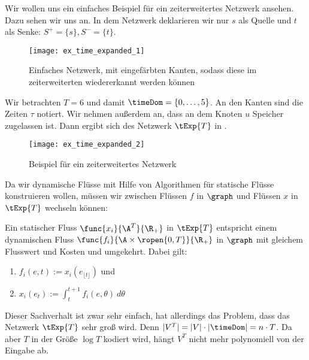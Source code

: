 \begin{example}
    Wir wollen uns ein einfaches Beispiel für ein zeiterweitertes Netzwerk 
    ansehen. Dazu sehen wir uns  an. In dem
    Netzwerk deklarieren wir nur $s$ als Quelle und $t$ als Senke:
    $S^+ = \{s\}, S^- = \{t\}$.

    \begin{figure}[H]
    \centering
    \texttt{[image: ex\_time\_expanded\_1]}
    \caption{Einfaches Netzwerk, mit eingefärbten Kanten, sodass diese im
                zeiterweiterten wiedererkannt werden können}
    \label{fig:ex_time_expanded_1}
    \end{figure}

    Wir betrachten $T = 6$ und damit $\timeDom = \{0, \ldots, 5\}$. An den
    Kanten sind die Zeiten $\tau$ notiert. Wir nehmen außerdem an, dass
    an dem Knoten $u$ Speicher zugelassen ist. Dann ergibt sich
    des Netzwerk $\tExp{T}$ in .

    \begin{figure}[H]
    \centering
    \texttt{[image: ex\_time\_expanded\_2]}
    \caption{Beispiel für ein zeiterweitertes Netzwerk}
    \label{fig:ex_time_expanded_2}
    \end{figure}
\end{example}

Da wir dynamische Flüsse mit Hilfe von Algorithmen für statische Flüsse
konstruieren wollen, müssen wir zwischen Flüssen $f$ in $\graph$ und
Flüssen $x$ in $\tExp{T}$ wechseln können:

\begin{lemma}\label{lem:static_dyn_conv}
    Ein statischer Fluss $\func{x_i}{\A^T}{\R_+}$ in $\tExp{T}$ entspricht einem
    dynamischen Fluss $\func{f_i}{\A \times \ropen{0,T}}{\R_+}$ in $\graph$
    mit gleichem Flusswert und Kosten und umgekehrt. Dabei gilt:
    \begin{enumerate}
        \item $f_i(e,t) := x_i(e_{\lfloor t \rfloor})$ und
        \item $x_i(e_t) := \int_t^{t+1} f_i(e, \theta) \: d\theta$
    \end{enumerate}
\end{lemma}

Dieser Sachverhalt ist zwar sehr einfach, hat allerdings das Problem, dass das
Netzwerk $\tExp{T}$ sehr groß wird. Denn $|V^T| = |V| \cdot |\timeDom| = n \cdot T$.
Da aber $T$ in der Größe $\log T$ kodiert wird, hängt $V^T$ nicht mehr polynomiell
von der Eingabe ab.

